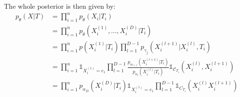 The whole posterior is then given by:
$$
\begin{align}
    p_{\theta}(X | T) &= \prod_{i=1}^n p_{\theta}(X_i | T_i) \\
                    &= \prod_{i=1}^n p_{\theta}(X_i^{(1)}, \dots, X_i^{(D)} | T_i) \\
                    &= \prod_{i=1}^n p(X_i^{(1)} | T_i) \prod_{l=1}^{D-1} p_{\gamma_j}(X_i^{(l+1)} | X_i^{(l)}, T_i) \\
                    &= \prod_{i=1}^n \mathds{1}_{X_i^{(1)} = e_1} \prod_{l=1}^{D-1} \frac{p_{\alpha_{l+1}}(X_i^{(l+1)} | T_i)}{p_{\alpha_{l}}(X_i^{(l)} | T_i)} \mathds{1}_{\mathcal{C}_{T_i}}\left(X_i^{(l)}, X_i^{(l+1)}\right) \\
                    &= \prod_{i=1}^n p_{\alpha_{D}}(X_i^{(D)} | T_i) \mathds{1}_{X_i^{(1)} = e_1} \prod_{l=1}^{D-1} \mathds{1}_{C_{T_i}}(X_i^{(l)} X_i^{(l+1)})
\end{align}
$$

